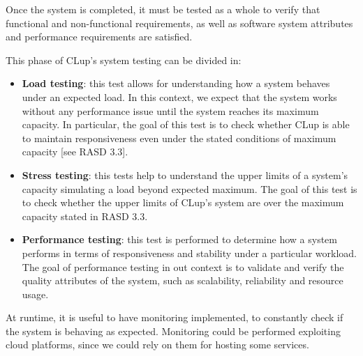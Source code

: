 \documentclass[../../main.tex]{subfiles}
\begin{document}
Once the system is completed, it must be tested as a whole to verify that functional and non-functional requirements, as well as software system attributes and performance requirements are satisfied.

This phase of CLup's system testing can be divided in:


\begin{itemize}

	\item \textbf{Load testing}: this test allows for understanding how a system behaves under an expected load. 
	In this context, we expect that the system works without any performance issue until the system reaches its maximum capacity. 
	In particular, the goal of this test is to check whether CLup is able to maintain responsiveness even under the stated conditions of maximum capacity [see RASD 3.3].

	\item \textbf{Stress testing}: this tests help to understand the upper limits of a system's capacity simulating a load beyond expected maximum. 
	The goal of this test is to check whether the upper limits of CLup's system are over the maximum capacity stated in RASD 3.3.

	\item \textbf{Performance testing}: this test is performed to determine how a system performs in terms of responsiveness and stability under a particular workload. 
	The goal of performance testing in out context is to validate and verify the quality attributes of the system, such as scalability, reliability and resource usage.
	

\end{itemize} 

At runtime, it is useful to have monitoring implemented, to constantly check if the system is behaving as expected. 
Monitoring could be performed exploiting cloud platforms, since we could rely on them for hosting some services.

\end{document}
